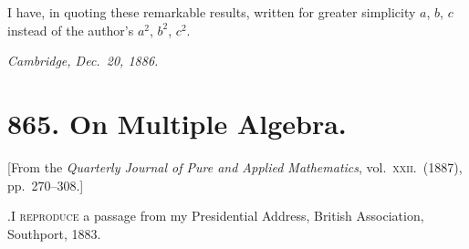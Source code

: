 \documentclass[11pt]{article}
\begin{document}
I have, in quoting these remarkable results, written for greater simplicity $a$, $b$, $c$ instead of the author's $a^{2}$, $b^{2}$, $c^{2}$.

\begin{flushright}\textit{Cambridge, Dec.~20, 1886.}\end{flushright}

\vfill
\newpage

\section*{865. On Multiple Algebra.}

\begin{flushright}\small
[From the \textit{Quarterly Journal of Pure and Applied Mathematics}, vol.~\textsc{xxii}.\ (1887), pp.~270--308.]
\end{flushright}

\medskip

.\quad\textsc{I reproduce} a passage from my Presidential Address, British Association, Southport, 1883.
\end{document}
